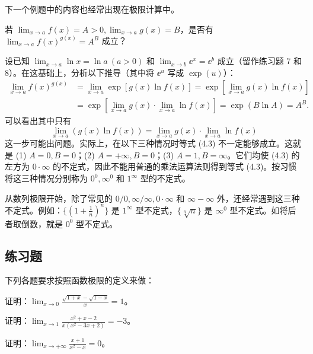 下一个例题中的内容也经常出现在极限计算中。

\begin{xexample}[4.1.6]
若 $\lim_{x\to a}f(x)=A>0,\lim_{x\to a}g(x)=B$，是否有 $\lim_{x\to a}f(x)^{g(x)}=A^B$ 成立？
\end{xexample}
\begin{xsolution}
设已知 $\lim_{x\to a}\ln x=\ln a\ (a>0)$ 和 $\lim_{x\to b}\ee^x=\ee^b$ 成立（留作练习题 7 和 8）。在这基础上，分析以下推导（其中将 $\ee^u$ 写成 $\exp(u)$）：
\begin{align*}
  \lim_{x\to a}f(x)^{g(x)}
  &=\lim_{x\to a}\exp[g(x)\ln f(x)]
   =\exp[\lim_{x\to a}g(x)\ln f(x)]\\
  &=\exp[\lim_{x\to a}g(x)\cdot\lim_{x\to a}\ln f(x)]
   =\exp(B\ln A)=A^B.
\end{align*}
可以看出其中只有
\begin{equation}
  \lim_{x\to a}(g(x)\ln f(x))=\lim_{x\to a}g(x)\cdot\lim_{x\to a}\ln f(x)
  \tag{4.3}
  \label{eq:4.3}
\end{equation}
这一步可能出问题。实际上，在以下三种情况时等式 (4.3) 不一定能够成立。这就是 (1) $A=0,B=0$；(2) $A=+\infty,B=0$；(3) $A=1,B=\infty$。它们均使 (4.3) 的左方为 $0\cdot\infty$ 的不定式，因此不能用普通的乘法运算法则得到等式 (4.3)。按习惯将这三种情况分别称为 $0^0,\infty^0$ 和 $1^\infty$ 型的不定式。
\end{xsolution}

\begin{xremark}
从数列极限开始，除了常见的 $0/0,\infty/\infty,0\cdot\infty$ 和 $\infty-\infty$ 外，还经常遇到这三种不定式。例如：$\{(1+\frac1n)^n\}$ 是 $1^\infty$ 型不定式，$\{\sqrt[n]{n}\}$ 是 $\infty^0$ 型不定式。如将后者取倒数，就是 $0^0$ 型不定式。
\end{xremark}

\subsection{练习题}

下列各题要求按照函数极限的定义来做：

\begin{xexercise}[1]
证明：$\displaystyle\lim_{x\to0}\frac{\sqrt{1+x}-\sqrt{1-x}}{x}=1$。
\end{xexercise}

\begin{xexercise}[2]
证明：$\displaystyle\lim_{x\to1}\frac{x^2+x-2}{x(x^2-3x+2)}=-3$。
\end{xexercise}

\begin{xexercise}[3]
证明：$\displaystyle\lim_{x\to+\infty}\frac{x+1}{x^2-x}=0$。
\end{xexercise}

